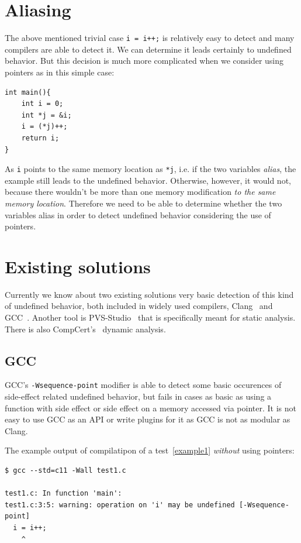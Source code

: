 \section{Aliasing}
The above mentioned trivial case \verb|i = i++;| is relatively easy to detect and many compilers are able to detect it.
We can determine it leads certainly to undefined behavior. But this decision is much more complicated when we consider using pointers as in this simple case:

\begin{lstlisting}
int main(){
	int i = 0;
	int *j = &i;
	i = (*j)++;
    return i;
}
\end{lstlisting}

As \verb|i| points to the same memory location as \verb|*j|, i.e. if the two variables \emph{alias}, the example still leads to the undefined behavior. Otherwise, however, it would not, because there wouldn't be more than one memory modification \emph{to the same memory location}. Therefore we need to be able to determine whether the two variables alias in order to detect undefined behavior considering the use of pointers.
\section{Existing solutions}
Currently we know about two existing solutions very basic detection of this kind of undefined behavior, both included in widely used compilers, Clang~\cite{Clang} and GCC~\cite{GCC}. Another tool is PVS-Studio~\cite{PVSStudio} that is specifically meant for static analysis. There is also CompCert's~\cite{CompCert} dynamic analysis.
\subsection{GCC}
GCC's \verb|-Wsequence-point| modifier is able to detect some basic occurences of side-effect related undefined behavior, but fails in cases as basic as using a function with side effect or side effect on a memory accessed via pointer. It is not easy to use GCC as an API or write plugins for it as GCC is not as modular as Clang.~\cite{ClangComparison}

The example output of compilatipon of a test~\ref{example1} \emph{without} using pointers:
\begin{lstlisting}
$ gcc --std=c11 -Wall test1.c

test1.c: In function 'main':
test1.c:3:5: warning: operation on 'i' may be undefined [-Wsequence-point]
  i = i++;
    ^
\end{lstlisting}

